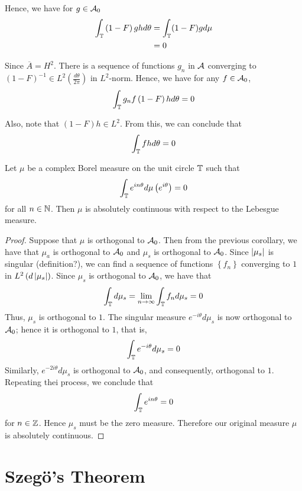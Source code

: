 Hence, we have for $g \in {\cal A}_{0}$
\begin{align*}
    \int_{\mathbb T} \left( 1-F \right) gh d\theta &= \int_{\mathbb T} (1-F)g d\mu  \\
    &= 0
\end{align*}

Since $\overline{A} = H^{2}$. There is a sequence of functions ${g_{n}}$ in ${\cal A}$ converging to $\left( 1-F \right)^{-1} \in L^{2} \left( \frac{d\theta}{2\pi} \right)$ in $L^{2}$-norm. Hence, we have for any $f\in {\cal A}_{0}$,
\begin{equation*}
    \int_{\mathbb T} g_{n}f\left( 1-F \right)h d\theta = 0
\end{equation*}


Also, note that $\left( 1-F \right)h \in L^{2}$. From this, we can conclude that 
\begin{equation*}
    \int_{\mathbb T} fh d\theta = 0
\end{equation*}

\begin{theorem}
    Let $\mu$ be a complex Borel measure on the unit circle $\mathbb T$ such that
    \begin{equation*}
	\int_{\mathbb T} e^{in\theta} d\mu \left( e^{i\theta} \right) =0
    \end{equation*}
    for all $n\in\mathbb N$. Then $\mu$ is absolutely continuous with respect to the Lebesgue measure.
    \label{thm:f-and-m-riesz}
\end{theorem}
\begin{proof}
    Suppose that $\mu$ is orthogonal to ${\cal A}_{0}$. Then from the previous corollary, we have that $\mu_{a}$ is orthogonal to ${\cal A}_{0}$ and $\mu_{s}$ is orthogonal to ${\cal A}_{0}$. Since $\left\lvert \mu_{s} \right\rvert$ is singular (definition?), we can find a sequence of functions $\left\{ f_{n} \right\}$ converging to $1$ in $L^{2} \left( d\left\lvert \mu_{s} \right\rvert \right)$. Since $\mu_{s}$ is orthogonal to ${\cal A}_{0}$, we have that
    \begin{equation*}
	\int_{\mathbb T} d\mu_{s} = \lim_{n\to \infty} \int_{\mathbb T} f_{n} d\mu_{s} = 0
    \end{equation*}
    Thus, $\mu_{s}$ is orthogonal to $1$. The singular measure $e^{-i\theta} d\mu_{s}$ is now orthogonal to ${\cal A}_{0}$; hence it is orthogonal to $1$, that is, 
    \begin{equation*}
    \int_{\mathbb T} e^{-i\theta} d\mu_{s} = 0
    \end{equation*}
    Similarly, $e^{-2i\theta} d\mu_{s}$ is orthogonal to ${\cal A}_{0}$, and consequently, orthogonal to $1$. Repeating thei process, we conclude that
    \begin{equation*}
	\int_{\mathbb T} e^{in\theta} = 0
    \end{equation*}
    for $n\in \mathbb Z$.
    Hence $\mu_{s}$ must be the zero measure. Therefore our original measure $\mu$ is absolutely continuous. 
\end{proof}
\section{Szegö's Theorem}
